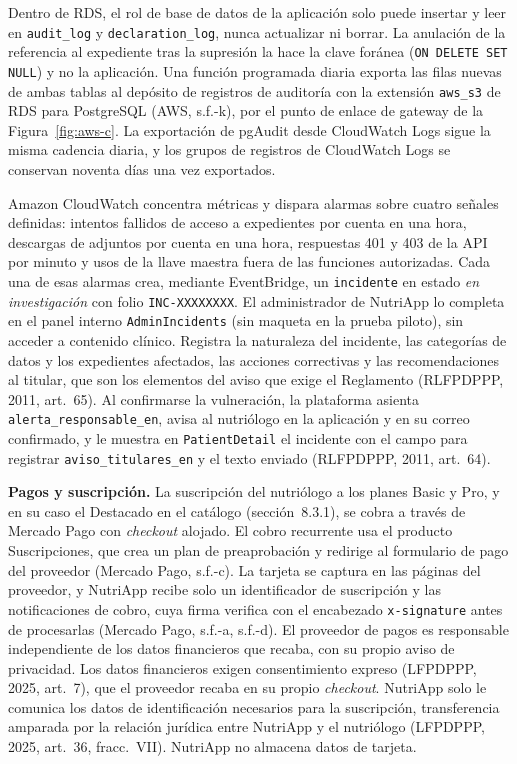 \documentclass[12pt, a4paper]{article}
\begin{document}
Dentro de RDS, el rol de base de datos de la aplicación solo puede
insertar y leer en \texttt{audit\_log} y \texttt{declaration\_log},
nunca actualizar ni borrar. La anulación de la referencia al expediente
tras la supresión la hace la clave foránea (\texttt{ON DELETE SET NULL})
y no la aplicación. Una función programada diaria exporta las filas
nuevas de ambas tablas al depósito de registros de auditoría con la
extensión \texttt{aws\_s3} de RDS para PostgreSQL (AWS, s.f.-k), por el
punto de enlace de gateway de la Figura~\ref{fig:aws-c}. La exportación
de pgAudit desde CloudWatch Logs sigue la misma cadencia diaria, y los
grupos de registros de CloudWatch Logs se conservan noventa días una vez
exportados.

Amazon CloudWatch concentra métricas y dispara alarmas sobre cuatro
señales definidas: intentos fallidos de acceso a expedientes por cuenta
en una hora, descargas de adjuntos por cuenta en una hora, respuestas
401 y 403 de la API por minuto y usos de la llave maestra fuera de las
funciones autorizadas. Cada una de esas alarmas crea, mediante EventBridge, un
\texttt{incidente} en estado \textit{en investigación} con folio
\texttt{INC-XXXXXXXX}. El administrador de NutriApp lo completa en el
panel interno \texttt{AdminIncidents} (sin maqueta en la prueba piloto),
sin acceder a contenido clínico. Registra la naturaleza del incidente,
las categorías de datos y los expedientes afectados, las acciones
correctivas y las recomendaciones al titular, que son los elementos del
aviso que exige el Reglamento (RLFPDPPP, 2011, art.~65). Al confirmarse
la vulneración, la plataforma asienta \texttt{alerta\_responsable\_en},
avisa al nutriólogo en la aplicación y en su correo confirmado, y le
muestra en \texttt{PatientDetail} el incidente con el campo para
registrar \texttt{aviso\_titulares\_en} y el texto enviado (RLFPDPPP,
2011, art.~64).

\textbf{Pagos y suscripción.} La suscripción del nutriólogo a los planes
Basic y Pro, y en su caso el Destacado en el catálogo (sección~8.3.1),
se cobra a través de Mercado Pago con \textit{checkout} alojado. El
cobro recurrente usa el producto Suscripciones, que crea un plan de
preaprobación y redirige al formulario de pago del proveedor (Mercado
Pago, s.f.-c). La tarjeta se captura en las páginas del proveedor, y
NutriApp recibe solo un identificador de suscripción y las
notificaciones de cobro, cuya firma verifica con el encabezado
\texttt{x-signature} antes de procesarlas (Mercado Pago, s.f.-a,
s.f.-d). El proveedor de pagos es responsable independiente de los datos
financieros que recaba, con su propio aviso de privacidad. Los datos
financieros exigen consentimiento expreso (LFPDPPP, 2025, art.~7), que
el proveedor recaba en su propio \textit{checkout}. NutriApp solo le
comunica los datos de identificación necesarios para la suscripción,
transferencia amparada por la relación jurídica entre NutriApp y el
nutriólogo (LFPDPPP, 2025, art.~36, fracc.~VII). NutriApp no almacena
datos de tarjeta.
\end{document}
